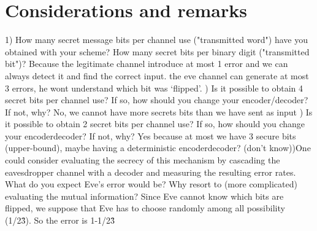 \documentclass{report}
\begin{document}
\section*{Considerations and remarks}
1) How many secret message bits per channel use ("transmitted word") have you obtained with your
scheme?
How many secret bits per binary digit ("transmitted bit")?  \hfill \break \linebreak
Because the legitimate channel introduce at most 1 error and we can always detect it and find the correct input. the eve channel can generate at most 3 errors, he wont understand which bit was ‘flipped’. \hfill \break  {}) Is it possible to obtain 4 secret bits per channel use?
If so, how should you change your encoder/decoder? If not, why? \hfill \break \linebreak
No, we cannot have more secrets bits than we have sent as input \hfill \break {}) Is it possible to obtain 2 secret bits per channel use?
If so, how should you change your encoder\/decoder? If not, why?  \hfill \break \linebreak
Yes because at most we have 3 secure bits (upper-bound), maybe having a deterministic encoder\/decoder? (don't know)\hfill \break {})One could consider evaluating the secrecy of this mechanism by cascading the eavesdropper channel
with a decoder and measuring the resulting error rates. What do you expect Eve's error would be?
Why resort to (more complicated) evaluating the mutual information? \hfill \break \linebreak
Since Eve cannot know which bits are flipped, we suppose that Eve has to choose randomly among all possibility (1\//2\^3). So the error is 1-1\//2\^3
\end{document}
